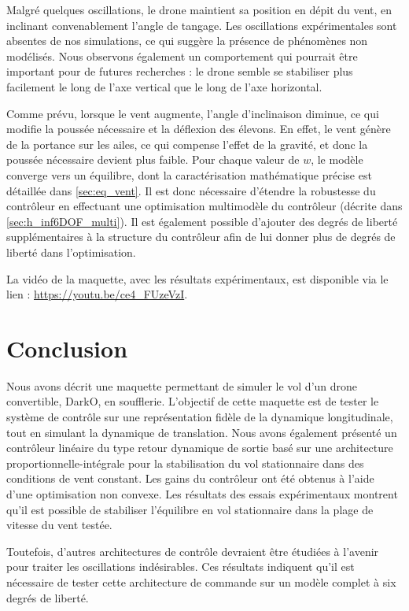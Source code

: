 Malgré quelques oscillations, le drone maintient sa position en dépit du vent, en inclinant convenablement l'angle de tangage. Les oscillations expérimentales sont absentes de nos simulations, ce qui suggère la présence de phénomènes non modélisés.
Nous observons également un comportement qui pourrait être important pour de futures recherches : le drone semble se stabiliser plus facilement le long de l'axe vertical que le long de l'axe horizontal. 

Comme prévu, lorsque le vent augmente, l'angle d'inclinaison diminue, ce qui modifie la poussée nécessaire et la déflexion des élevons. En effet, le vent génère de la portance sur les ailes, ce qui compense l'effet de la gravité, et donc la poussée nécessaire devient plus faible.
Pour chaque valeur de $w$, le modèle converge vers un équilibre, dont la caractérisation mathématique précise est détaillée dans \ref{sec:eq_vent}. Il est donc nécessaire d'étendre la robustesse du contrôleur en effectuant une optimisation multimodèle du contrôleur (décrite dans \ref{sec:h_inf6DOF_multi}). Il est également possible d'ajouter des degrés de liberté supplémentaires à  la structure du contrôleur afin de lui donner plus de degrés de liberté dans l'optimisation.

La vidéo de la maquette, avec les résultats expérimentaux, est disponible via le lien : \url{https://youtu.be/ce4_FUzeVzI}.



\section{Conclusion}
Nous avons décrit une maquette permettant de simuler le vol d'un drone convertible, DarkO, en soufflerie. L'objectif de cette maquette est de tester le système de contrôle sur une représentation fidèle de la dynamique longitudinale, tout en simulant la dynamique de translation. Nous avons également présenté un contrôleur linéaire du type retour dynamique de sortie basé sur une architecture proportionnelle-intégrale pour la stabilisation du vol stationnaire dans des conditions de vent constant. Les gains du contrôleur ont été obtenus à l'aide d'une optimisation non convexe. Les résultats des essais expérimentaux montrent qu'il est possible de stabiliser l'équilibre en vol stationnaire dans la plage de vitesse du vent testée. 

Toutefois, d'autres architectures de contrôle devraient être étudiées à l'avenir pour traiter les oscillations indésirables. Ces résultats indiquent qu'il est nécessaire de tester cette architecture de commande sur un modèle complet à six degrés de liberté.
